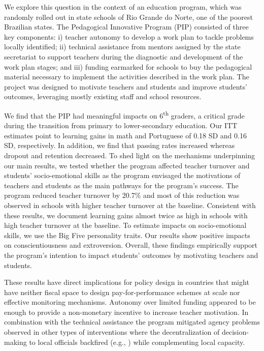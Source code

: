 \documentclass[11pt,a4paper]{article}
\begin{document}
We explore this question in the context of an education program, which was randomly rolled out in state schools of Rio Grande do Norte, one of the poorest Brazilian states. The Pedagogical Innovative Program (PIP) consisted of three key components: i) teacher autonomy to develop a work plan to tackle problems locally identified; ii) technical assistance from mentors assigned by the state secretariat to support teachers during the diagnostic and development of the work plan stages; and iii) funding earmarked for schools to buy the pedagogical material necessary to implement the activities described in the work plan. The project was designed to motivate teachers and students and improve students' outcomes, leveraging mostly existing staff and school resources. 

We find that the PIP had meaningful impacts on 6\textsuperscript{th} graders, a critical grade during the transition from primary to lower-secondary education. Our ITT estimates point to learning gains in math and Portuguese of 0.18 SD and 0.16 SD, respectively. In addition, we find that passing rates increased whereas dropout and retention decreased. To shed light on the mechanisms underpinning our main results, we tested whether the program affected teacher turnover and students' socio-emotional skills as the program envisaged the motivations of teachers and students as the main pathways for the program's success. The program reduced teacher turnover by 20.7\% and most of this reduction was observed in schools with higher teacher turnover at the baseline. Consistent with these results, we document learning gains almost twice as high in schools with high teacher turnover at the baseline. To estimate impacts on socio-emotional skills, we use the Big Five personality traits. Our results show positive impacts on conscientiousness and extroversion. Overall, these findings empirically support the program's intention to impact students' outcomes by motivating teachers and students. 

These results have direct implications for policy design in countries that might have neither fiscal space to design pay-for-performance schemes at scale nor effective monitoring mechanisms. Autonomy over limited funding appeared to be enough to provide a non-monetary incentive to increase teacher motivation. In combination with the technical assistance the program mitigated agency problems observed in other types of interventions where the decentralization of decision-making to local officials backfired (e.g., \citealp{banerjee2020improving}) while complementing local capacity.
\end{document}
